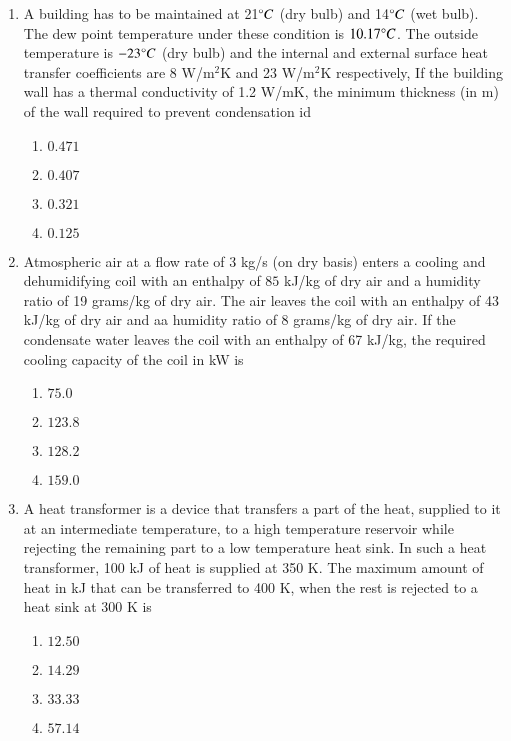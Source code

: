 \documentclass[journal,9pt,onecolumn]{IEEEtran}
\begin{document}
\begin{enumerate}


\item A building has to be maintained at 21$\degree C$ (dry bulb) and 14$\degree C$ (wet bulb). The dew point temperature under these condition is $10.17\degree C$. The outside temperature is $-23\degree C$ (dry bulb) and the internal and external surface heat transfer coefficients are 8 W/m$^2$K and 23 W/m$^2$K respectively, If the building wall has a thermal conductivity of 1.2 W/mK, the minimum thickness (in m) of the wall required to prevent condensation id
\begin{multicols}{4}
\begin{enumerate}
    \item $0.471$
    \item $0.407$
    \item $0.321$
    \item $0.125$
\end{enumerate}
\end{multicols}

\item Atmospheric air at a flow rate of 3 kg/s (on dry basis) enters a cooling and dehumidifying coil with an enthalpy of $85$ kJ/kg of dry air and a humidity ratio of 19 grams/kg of dry air. The air leaves the coil with an enthalpy of 43 kJ/kg of dry air and aa humidity ratio of 8 grams/kg of dry air. If the condensate water leaves the coil with an enthalpy of 67 kJ/kg, the required cooling capacity of the coil in kW is
\begin{multicols}{4}
\begin{enumerate}
    \item $75.0$
    \item $123.8$
    \item $128.2$
    \item $159.0$
\end{enumerate}
\end{multicols}



\item A heat transformer is a device that transfers a part of the heat, supplied to it at an intermediate temperature, to a high temperature reservoir while rejecting the remaining part to a low temperature heat sink. In such a heat transformer, 100 kJ of heat is supplied at 350 K. The maximum amount of heat in kJ that can be transferred to 400 K, when the rest is rejected to a heat sink at 300 K is
\begin{multicols}{4}
\begin{enumerate}
    \item $12.50$ 
    \item $14.29$ 
    \item $33.33$ 
    \item $57.14$ 
\end{enumerate}
\end{multicols}


\end{enumerate}
\end{document}
